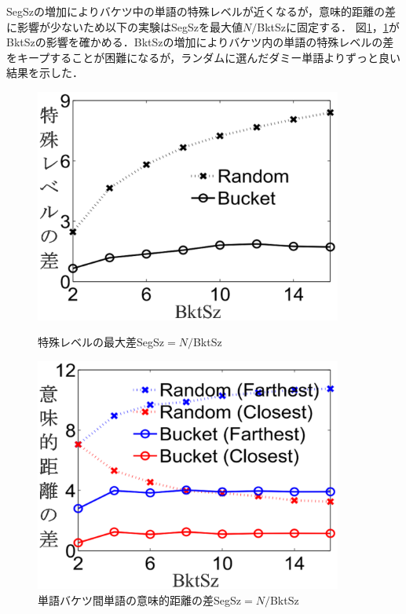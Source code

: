\documentclass{jsarticle}
\theoremstyle{definition}
\begin{document}
SegSzの増加によりバケツ中の単語の特殊レベルが近くなるが，意味的距離の差に影響が少ないため以下の実験はSegSzを最大値$N/$BktSzに固定する．
図\ref{fig:r4}，\ref{fig:r4}がBktSzの影響を確かめる．BktSzの増加によりバケツ内の単語の特殊レベルの差をキープすることが困難になるが，ランダムに選んだダミー単語よりずっと良い結果を示した．

\begin{figure}
\begin{minipage}[t]{0.5\linewidth}
\centering
\includegraphics[width=0.9\textwidth]{rk19.eps}
\caption{特殊レベルの最大差SegSz$=N/$BktSz}
\label{fig:r3}
\end{minipage}%
\begin{minipage}[t]{0.5\linewidth}
\centering
\includegraphics[width=0.9\textwidth]{rk20.eps}
\caption{単語バケツ間単語の意味的距離の差SegSz$=N/$BktSz}
\label{fig:r4}
\end{minipage}
\end{figure}
\end{document}
